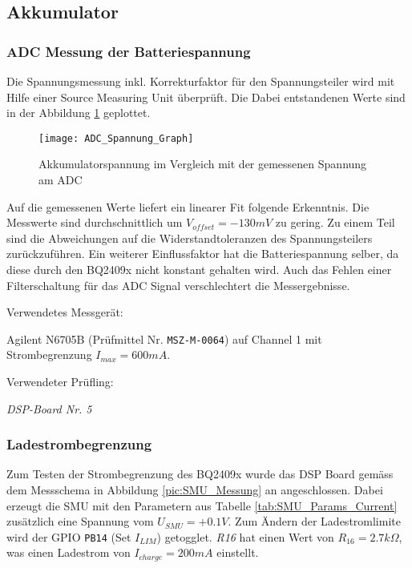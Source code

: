 \subsection{Akkumulator}
\label{sec:Valid_Batterie}

\subsubsection{ADC Messung der Batteriespannung}

Die Spannungsmessung inkl. Korrekturfaktor für den Spannungsteiler wird mit Hilfe einer Source Measuring Unit überprüft. Die Dabei entstandenen Werte sind in der Abbildung \ref{pic:ADC_Spannung_Graph} geplottet.

\begin{figure}[H]
	\centering
	\texttt{[image: ADC\_Spannung\_Graph]}
	\caption{Akkumulatorspannung im Vergleich mit der gemessenen Spannung am ADC}
	\label{pic:ADC_Spannung_Graph}
\end{figure}

Auf die gemessenen Werte liefert ein linearer Fit folgende Erkenntnis.
Die Messwerte sind durchschnittlich um $V_{offset}=-130\si{mV}$ zu gering.
Zu einem Teil sind die Abweichungen auf die Widerstandtoleranzen des Spannungsteilers zurückzuführen.
Ein weiterer Einflussfaktor hat die Batteriespannung selber, da diese durch den BQ2409x nicht konstant gehalten wird. Auch das Fehlen einer Filterschaltung für das ADC Signal verschlechtert die Messergebnisse.

Verwendetes Messgerät:

Agilent N6705B (Prüfmittel Nr. \texttt{MSZ-M-0064}) auf Channel 1 mit Strombegrenzung $I_{max}=600\si{mA}$.

Verwendeter Prüfling:

\textit{DSP-Board Nr. 5}


\subsubsection{Ladestrombegrenzung}


Zum Testen der Strombegrenzung des BQ2409x wurde das DSP Board gemäss dem Messschema in Abbildung \ref{pic:SMU_Messung} an angeschlossen.
Dabei erzeugt die SMU mit den Parametern aus Tabelle \ref{tab:SMU_Params_Current} zusätzlich eine Spannung vom $U_{SMU}=+0.1\si{V}$.
Zum Ändern der Ladestromlimite wird der GPIO \texttt{PB14} (Set $I_{LIM}$) getogglet.
\textit{R16} hat einen Wert von $R_{16}=2.7k\Omega$, was einen Ladestrom von $I_{charge}=200\si{mA}$ einstellt.

